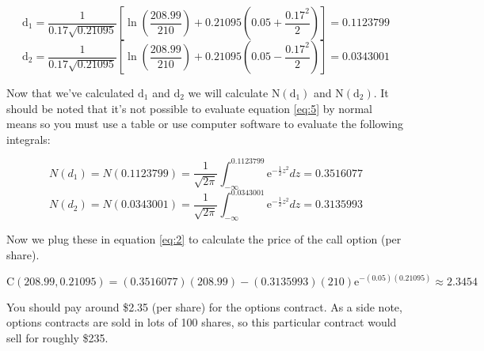 \documentclass{article}
\begin{document}
$$\mathrm d_1= \frac{1}{0.17 \sqrt{0.21095}} \left[\ln{\left(\frac{208.99}{210}\right)} + 0.21095\left(0.05 + \frac{0.17^2}{2} \right) \right]=0.1123799$$
$$\mathrm d_2= \frac{1}{0.17 \sqrt{0.21095}} \left[\ln{\left(\frac{208.99}{210}\right)} + 0.21095\left(0.05 - \frac{0.17^2}{2} \right) \right]=0.0343001$$

Now that we've calculated $\mathrm d_1$ and $\mathrm d_2$ we will calculate $\mathrm N(\mathrm d_1)$ and $\mathrm N(\mathrm d_2)$. It should be noted that it's 
not possible to evaluate equation \eqref{eq:5} by normal means so you must use a table or use computer software to evaluate the
following integrals:

$$N(d_1)=N(0.1123799)=\frac{1}{\sqrt{2\pi}} \int_{-\infty}^{0.1123799} \mathrm e^{-\frac{1}{2}z^2} dz = 0.3516077$$
$$N(d_2)=N(0.0343001)=\frac{1}{\sqrt{2\pi}} \int_{-\infty}^{0.0343001} \mathrm e^{-\frac{1}{2}z^2} dz = 0.3135993$$

Now we plug these in equation \eqref{eq:2} to calculate the price of the call option (per share).

$$\mathrm C(208.99,0.21095)= (0.3516077)(208.99) - (0.3135993)(210) \mathrm e^{-(0.05)(0.21095)} \approx 2.3454$$

You should pay around \$2.35 (per share) for the options contract. As a side note, options contracts are sold in lots of 100 shares, 
so this particular contract would sell for roughly \$235.
\end{document}
